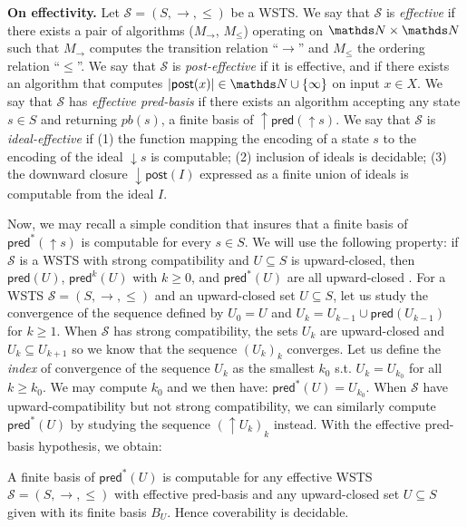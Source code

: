 \documentclass[runningheads]{llncs}
\newcommand{\pred}{\textsf{pred}}
\newcommand{\post}{\textsf{post}}
\begin{document}
\noindent
{\bf On effectivity.}
Let $\mathscr{S}=(S, \rightarrow, \leq)$ be a WSTS. We say that $\mathscr{S}$ is {\em effective} if there exists a pair of algorithms
($M_\rightarrow$, $M_\leq$) operating on $\N \times \N$ such that
$ M_\rightarrow$ computes the transition relation “$\rightarrow$” and 
$M_\leq$ the ordering relation “$\leq$”.
We say that $\mathscr{S}$ is {\em post-effective} if it is effective, and if there
exists an algorithm that computes $|\post(x)| \in \N \cup \{\infty\}$ 
on input $x \in X$. 
We say that $\mathscr{S}$ has {\em effective pred-basis} \cite{DBLP:journals/tcs/FinkelS01,DBLP:journals/iandc/AbdullaCJT00} if there exists an algorithm accepting
any state $s \in S$ and returning $pb(s)$, a finite basis of $\uparrow \pred(\uparrow s)$.
%
We say that $\mathscr{S}$
is {\em ideal-effective} \cite{BFM-ic17} if (1) the function mapping the encoding of a state $s$
to the encoding of the ideal $\downarrow s$ is computable; (2) inclusion of ideals is decidable; (3) the downward closure $\downarrow \post(I)$ expressed as a finite union of ideals is computable from the ideal $I$.
%

Now, we may recall a simple condition that insures that a finite basis of $\pred^*(\uparrow s )$ is computable for every $s \in S$.
We will use the following property: if $\mathscr{S}$ is a WSTS with strong compatibility and $U \subseteq S$ is upward-closed, then $\pred(U )$, $\pred^k(U )$ with $k\geq0$, and $\pred^*(U )$ are all upward-closed \cite{DBLP:journals/tcs/FinkelS01}.
For a WSTS $\mathscr{S}=(S, \rightarrow, \leq)$ and an upward-closed set $U  \subseteq S$, let us study the convergence of the sequence defined by $U_0=U$ and $U_k= U_{k-1} \cup \pred(U_{k-1})$ for $k \geq 1$. When $\mathscr{S}$ has strong compatibility, the sets $U_k$ are upward-closed and $U_k \subseteq U_{k+1}$ so we know that the sequence $(U_k)_k$ converges. Let us define the \emph{index} of convergence of the sequence $U_k$ as the smallest $k_0$ s.t. $U_k = U_{k_0}$ for all $k \geq k_0$. We may compute $k_0$ and we then have:  $\pred^*(U) = U_{k_0}$. When $\mathscr{S}$ have upward-compatibility but not strong compatibility, we can similarly compute $\pred^*(U)$ by studying the sequence $(\uparrow U_k)_k$ instead.
With the effective pred-basis hypothesis, we obtain:

\begin{theorem}\cite{DBLP:journals/tcs/FinkelS01,DBLP:journals/iandc/AbdullaCJT00}
A finite basis of $ \pred^*(U)$ is computable for any effective WSTS $\mathscr{S}=(S, \rightarrow, \leq)$ with effective pred-basis and any upward-closed set $U \subseteq S$ given with its finite basis $B_U$. Hence coverability is decidable.
\end{theorem}
\end{document}
